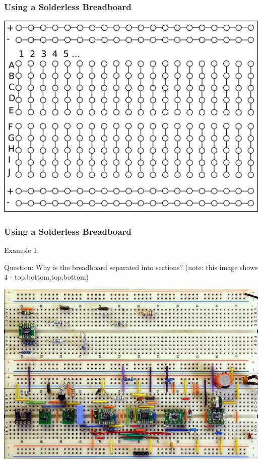 \documentclass[fleqn]{beamer} %
\newcommand{\sectionIIsubsectionIItitle}{Using a Solderless Breadboard}
\begin{document}
			\begin{frame}
				\frametitle{\sectionIIsubsectionIItitle}

				\includegraphics[scale=.080]{images/breadboard_template.png}
		

			\end{frame}

			\begin{frame}
				\frametitle{\sectionIIsubsectionIItitle}

				Example 1:

				Question: Why is the breadboard separated into sections? 
				(note: this image shows 4 - top,bottom,top,bottom) 

				\includegraphics[scale=.20]{images/breadboard_wcircuit.jpg}

			\end{frame}
\end{document}
